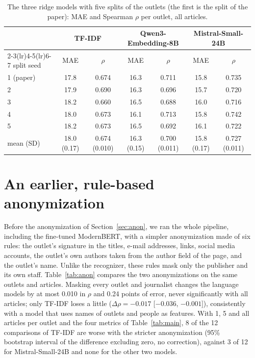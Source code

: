 \documentclass[11pt,a4paper]{article}
\begin{document}
\begin{table}[h]
\centering
\caption{The three ridge models with five splits of the outlets (the first is the split of the paper): MAE and
Spearman $\rho$ per outlet, all articles.}\label{tab:splits}
\small\setlength{\tabcolsep}{4pt}
\begin{tabular}{lcccccc}
\toprule
& \multicolumn{2}{c}{TF-IDF} & \multicolumn{2}{c}{Qwen3-Embedding-8B} & \multicolumn{2}{c}{Mistral-Small-24B} \\
\cmidrule(lr){2-3}\cmidrule(lr){4-5}\cmidrule(lr){6-7}
split seed & MAE & $\rho$ & MAE & $\rho$ & MAE & $\rho$ \\
\midrule
1 (paper) & 17.8 & 0.674 & 16.3 & 0.711 & 15.8 & 0.735 \\
2 & 17.9 & 0.690 & 16.3 & 0.696 & 15.7 & 0.720 \\
3 & 18.2 & 0.660 & 16.5 & 0.688 & 16.0 & 0.716 \\
4 & 18.0 & 0.673 & 16.1 & 0.713 & 15.8 & 0.742 \\
5 & 18.2 & 0.673 & 16.5 & 0.692 & 16.1 & 0.722 \\
\midrule
mean (SD) & 18.0 (0.17) & 0.674 (0.010) & 16.3 (0.15) & 0.700 (0.011) & 15.8 (0.17) & 0.727 (0.011) \\
\bottomrule
\end{tabular}
\end{table}

\section{An earlier, rule-based anonymization}\label{app:anon}
Before the anonymization of Section~\ref{sec:anon}, we ran the whole pipeline, including the fine-tuned ModernBERT, with
a simpler anonymization made of six rules: the outlet's signature in the titles, e-mail addresses, links, social media
accounts, the outlet's own authors taken from the author field of the page, and the outlet's name. Unlike the
recognizer, these rules mask only the publisher and its own staff. Table~\ref{tab:anon} compares the two anonymizations
on the same outlets and articles. Masking every outlet and journalist changes the language models by at most 0.010 in
$\rho$ and 0.24 points of error, never significantly with all articles; only TF-IDF loses a little ($\Delta\rho =
-0.017$ [$-0.036$, $-0.001$]), consistently with a model that uses names of outlets and people as features. With 1, 5
and all articles per outlet and the four metrics of Table~\ref{tab:main}, 8 of the 12 comparisons of TF-IDF are worse
with the stricter anonymization (95\% bootstrap interval of the difference excluding zero, no correction), against 3
of 12 for Mistral-Small-24B and none for the other two models.
\end{document}
